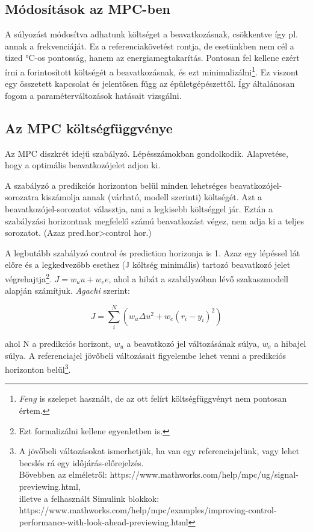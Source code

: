 \subsection{Módosítások az MPC-ben}

A súlyozást módosítva adhatunk költséget a beavatkozásnak, csökkentve így pl. annak a frekvenciáját. Ez a referenciakövetést rontja, de esetünkben nem cél a tized \si{\celsius}-os pontosság, hanem az energiamegtakarítás.
Pontosan fel kellene ezért írni a forintosított költségét a beavatkozásnak, és ezt minimalizálni\footnote{\textit{Feng \cite{FENG2015199}} is szelepet használt, de az ott felírt költségfüggvényt nem pontosan értem.}. Ez viszont egy összetett kapcsolat és jelentősen függ az épületgépészettől. Így általánosan fogom a paraméterváltozások hatásait vizsgálni.

\subsection{Az MPC költségfüggvénye}

Az MPC diszkrét idejű szabályzó. Lépésszámokban gondolkodik. Alapvetése, hogy a  optimális beavatkozójelet adjon ki.

A szabályzó a predikciós horizonton belül minden lehetséges beavatkozójel-sorozatra kiszámolja annak (várható, modell szerinti) költségét. Azt a beavatkozójel-sorozatot választja, ami a legkisebb költséggel jár. Eztán a szabályzási horizontnak megfelelő számú beavatkozást végez, nem adja ki a teljes sorozatot. (Azaz pred.hor>control hor.)

A legbutább szabályzó control és prediction horizonja is 1. Azaz egy lépéssel lát előre és a legkedvezőbb esethez (J költség minimális) tartozó beavatkozó jelet végrehajtja\footnote{Ezt formalizálni kellene egyenletben is.}. $J=w_u u + w_e e$, ahol a hibát a szabályzóban lévő szakaszmodell alapján számítjuk. \textit{Agachi \cite{romanMPC_Agachi}} szerint:%

\begin{equation} \label{eq_mpc_cost}
J = \sum_{i}^{N} \left(w_u \Delta u^2 + w_e (r_i-y_i)^2  \right)
\end{equation}

ahol N a predikciós horizont, $w_u$ a beavatkozó jel változásának súlya, $w_e$ a hibajel súlya. A referenciajel jövőbeli változásait figyelembe lehet venni a predikciós horizonton belül\footnote{A jövőbeli változásokat ismerhetjük, ha van egy referenciajelünk, vagy lehet becslés rá egy időjárás-előrejelzés.\\Bővebben az elméletről: https://www.mathworks.com/help/mpc/ug/signal-previewing.html,\\illetve a felhasznált Simulink blokkok: https://www.mathworks.com/help/mpc/examples/improving-control-performance-with-look-ahead-previewing.html}.

